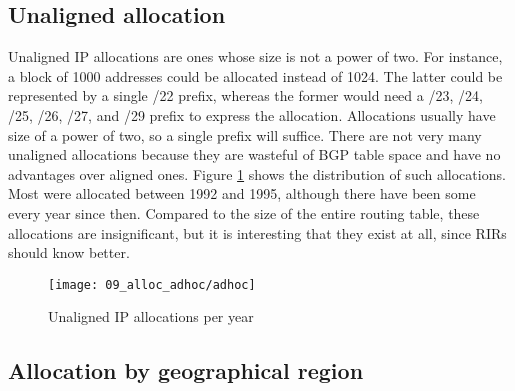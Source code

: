 \subsection{Unaligned allocation}
Unaligned IP allocations are ones whose size is not a power of two. For instance, a block of 1000 addresses could be allocated instead of 1024. The latter could be represented by a single /22 prefix, whereas the former would need a /23, /24, /25, /26, /27, and /29 prefix to express the allocation. Allocations usually have size of a power of two, so a single prefix will suffice. There are not very many unaligned allocations because they are wasteful of BGP table space and have no advantages over aligned ones. Figure \ref{fig:unaligned IP allocations} shows the distribution of such allocations. Most were allocated between 1992 and 1995, although there have been some every year since then. Compared to the size of the entire routing table, these allocations are insignificant, but it is interesting that they exist at all, since RIRs should know better.
\begin{figure}[htbp]
 	\centering
 		\texttt{[image: 09\_alloc\_adhoc/adhoc]}
	\caption{Unaligned IP allocations per year}
 	\label{fig:unaligned IP allocations}
\end{figure}
\subsection{Allocation by geographical region}




